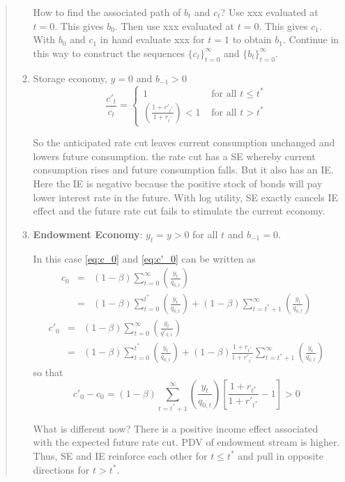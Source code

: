 \begin{exercise}
\begin{quote}
\begin{enumerate}
How to find the associated path of $b_t$ and $c_t$? Use xxx evaluated at $t=0$. This gives $b_0$. Then use xxx evaluated at $t=0$. This gives $c_1$. With $b_0$ and $c_1$ in hand evaluate xxx for $t=1$ to obtain $b_1$. Continue in this way to construct the sequences $\{c_t\}_{t=0}^{\infty}$ and $\{b_t\}_{t=0}^{\infty}$. 

\item Storage economy, $y=0$ and $b_{-1}>0$
\[
\frac{c'_t}{c_t} = \left\{  \begin{array}{ll}
1 & \mbox{ for all } t\le t^*\\
\left(\frac{1+r'_{t^*}}{1+r_{t^*}} \right) <1 & \mbox{ for all } t> t^*
\end{array}
\right.
\]

So the anticipated rate cut leaves current consumption unchanged and lowers future consumption. the rate cut has a SE whereby current consumption rises and future consumption falls. But it also has an IE. Here the IE is negative because the positive stock of bonds will pay lower interest rate in the future. With log utility, SE exactly cancels IE effect and the future rate cut fails to stimulate the current economy. 

\item 
{\bf Endowment Economy}: $y_t = y>0$ for all $t$ and $b_{-1}=0$. 

In this case \eqref{eq:c_0} and \eqref{eq:c'_0} can be written as
\begin{eqnarray*}
\label{eq:c_0_endowment}
c_0 &=& 
 (1-\beta)   \sum_{t=0}^{\infty} 
\left(\frac{y_{t}}{q_{0,t}} \right)
\\&=& 
 (1-\beta)   \sum_{t=0}^{t^*} 
\left(\frac{y_{t}}{q_{0,t}} \right)
+ (1-\beta)   \sum_{t=t^*+1}^{\infty} 
\left(\frac{y_{t}}{q_{0,t}} \right)
\end{eqnarray*}
\begin{eqnarray*}
\label{eq:c'_0_endowment}
c'_0 &=&  (1-\beta)  \sum_{t=0}^{\infty} 
\left(
\frac{y_{t} }
{q'_{0,t}} 
\right)\\
&=& 
 (1-\beta)   \sum_{t=0}^{t^*} 
\left(\frac{y_{t}}{q_{0,t}} \right)
+ (1-\beta) \frac{1+r_{t^*}}{1+r'_{t^*}}
  \sum_{t=t^*+1}^{\infty} 
\left(\frac{y_{t}}{q_{0,t}} \right)
\end{eqnarray*}
so that 
\[
c'_0 - c_0 = (1-\beta)  \sum_{t=t^*+1}^{\infty} 
\left(\frac{y_{t}}{q_{0,t}} \right) \left[\frac{1+r_{t^*}}{1+r'_{t^*}} -1\right]
>0\]



What is different now? There is a positive income effect associated with the expected future rate cut. PDV of endowment stream is higher. Thus, SE and IE reinforce each other for $t\le t^*$ and pull in opposite directions for $t>t^*$. 


\end{enumerate}
\end{quote}
\end{exercise}
